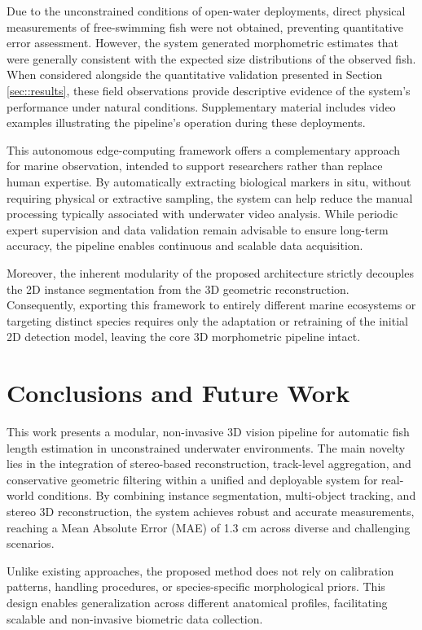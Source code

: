 \documentclass[utf8]{FrontiersinHarvard} %
\begin{document}
Due to the unconstrained conditions of open-water deployments, direct physical measurements of free-swimming fish were not obtained, preventing quantitative error assessment. However, the system generated morphometric estimates that were generally consistent with the expected size distributions of the observed fish. When considered alongside the quantitative validation presented in Section \ref{sec::results}, these field observations provide descriptive evidence of the system’s performance under natural conditions. Supplementary material includes video examples illustrating the pipeline’s operation during these deployments.

This autonomous edge-computing framework offers a complementary approach for marine observation, intended to support researchers rather than replace human expertise. By automatically extracting biological markers in situ, without requiring physical or extractive sampling, the system can help reduce the manual processing typically associated with underwater video analysis. While periodic expert supervision and data validation remain advisable to ensure long-term accuracy, the pipeline enables continuous and scalable data acquisition. 


Moreover, the inherent modularity of the proposed architecture strictly decouples the 2D instance segmentation from the 3D geometric reconstruction. Consequently, exporting this framework to entirely different marine ecosystems or targeting distinct species requires only the adaptation or retraining of the initial 2D detection model, leaving the core 3D morphometric pipeline intact. 


\section{Conclusions and Future Work}\label{sec::conclusions}


This work presents a modular, non-invasive 3D vision pipeline for automatic fish length estimation in unconstrained underwater environments. The main novelty lies in the integration of stereo-based reconstruction, track-level aggregation, and conservative geometric filtering within a unified and deployable system for real-world conditions. By combining instance segmentation, multi-object tracking, and stereo 3D reconstruction, the system achieves robust and accurate measurements, reaching a Mean Absolute Error (MAE) of 1.3 cm across diverse and challenging scenarios.

Unlike existing approaches, the proposed method does not rely on calibration patterns, handling procedures, or species-specific morphological priors. This design enables generalization across different anatomical profiles, facilitating scalable and non-invasive biometric data collection.
\end{document}
